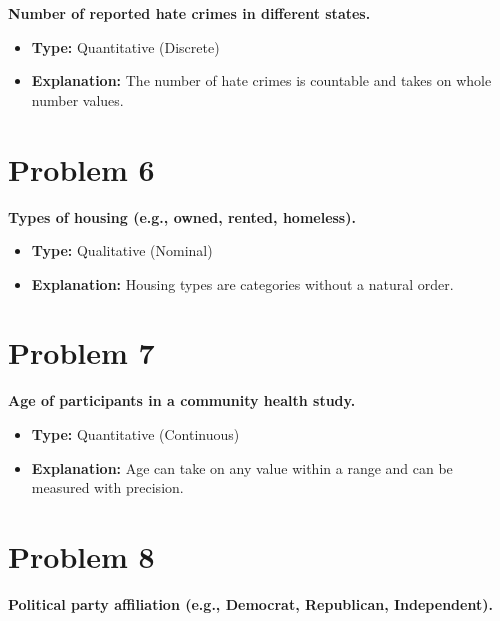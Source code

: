 \documentclass[
  letterpaper,
  DIV=11,
  numbers=noendperiod]{scrreprt}
\begin{document}

\textbf{Number of reported hate crimes in different states.}

\begin{itemize}
\item
  \textbf{Type:} Quantitative (Discrete)
\item
  \textbf{Explanation:} The number of hate crimes is countable and takes
  on whole number values.
\end{itemize}

\section*{Problem 6}\label{problem-6-2}


\textbf{Types of housing (e.g., owned, rented, homeless).}

\begin{itemize}
\item
  \textbf{Type:} Qualitative (Nominal)
\item
  \textbf{Explanation:} Housing types are categories without a natural
  order.
\end{itemize}

\section*{Problem 7}\label{problem-7-2}


\textbf{Age of participants in a community health study.}

\begin{itemize}
\item
  \textbf{Type:} Quantitative (Continuous)
\item
  \textbf{Explanation:} Age can take on any value within a range and can
  be measured with precision.
\end{itemize}

\section*{Problem 8}\label{problem-8-2}


\textbf{Political party affiliation (e.g., Democrat, Republican,
Independent).}
\end{document}
